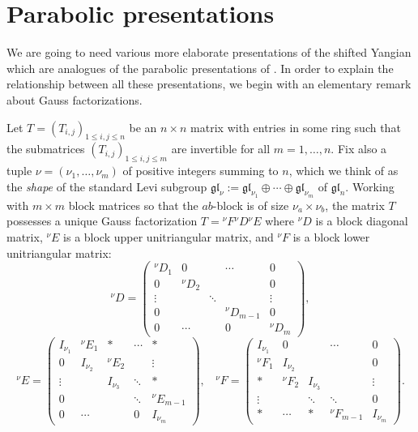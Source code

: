 \documentclass[twoside,12pt,reqno]{amsart}
\begin{document}
\section{Parabolic presentations}\label{sparabolic}

We are going to need
various more elaborate presentations of the shifted Yangian which
are analogues of the parabolic presentations of \cite{BK}.
In order to explain the relationship between all these presentations,
we begin with an elementary remark about Gauss factorizations.

Let $T = (T_{i,j})_{1 \leq i,j \leq n}$ be an $n \times n$
matrix with entries in some ring 
such that the submatrices $(T_{i,j})_{1 \leq i,j \leq m}$
are invertible for all $m=1,\dots,n$.
Fix also a tuple $\nu = (\nu_1,\dots,\nu_m)$ of positive integers
summing to $n$, which we think of as the {\em shape} of
the standard Levi subgroup 
$\mathfrak{gl}_\nu
:=
\mathfrak{gl}_{\nu_1}\oplus\cdots\oplus \mathfrak{gl}_{\nu_m}$ 
of $\mathfrak{gl}_n$.
Working with $m \times m$ block matrices so that the 
$ab$-block is of size $\nu_a \times \nu_b$,
the matrix $T$ possesses a unique {Gauss} factorization
$T = {^\nu}F{^\nu}D{^\nu}E$
where ${^\nu}D$ is a block diagonal matrix,
${^\nu}E$ is a block upper unitriangular matrix,
and ${^\nu}F$ is a block lower unitriangular matrix:
$${^\nu}D =
\left(
\begin{array}{lllll}
{^\nu}D_1&0&&\cdots&0\\
0&{^\nu}D_2&&&0\\
\vdots&&\ddots&&\vdots\\
0&&&{^\nu}D_{m-1}&0\\
0&\cdots&&0&{^\nu}D_m
\end{array}
\right),
$$$$
{^\nu}E = 
\left(
\begin{array}{lllll}
I_{\nu_1}&{^\nu}E_1&*&\cdots&*\\
0&I_{\nu_2}&{^\nu}E_2&&\vdots\\
\vdots&&I_{\nu_3}&\ddots&*\\
0&&&\ddots&{^\nu}E_{m-1}\\
0&\cdots&&0&I_{\nu_m}
\end{array}\right),\:\:\:\:
{^\nu}F = 
\left(
\begin{array}{lllll}
I_{\nu_1}&0&&\cdots&0\\
{^\nu}F_1&I_{\nu_2}&&&0\\
*&{^\nu}F_2&I_{\nu_3}&&\vdots\\
\vdots&&\ddots&\ddots&0\\
*&\cdots&*&{^\nu}F_{m-1}&I_{\nu_m}
\end{array}\right).
$$
\end{document}
